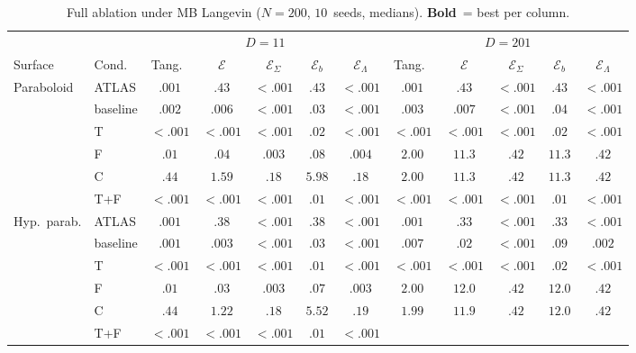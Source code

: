 \documentclass[11pt]{article}
\newcommand{\cE}{\mathcal{E}}
\begin{document}
\begin{table}[ht]
\centering
\caption{Full ablation under MB Langevin ($N{=}200$, $10$~seeds, medians).
\textbf{Bold}~= best per column.}
\label{tab:full-ablation-mb}
\footnotesize
\begin{tabular}{ll ccccc ccccc}
\toprule
 & & \multicolumn{5}{c}{$D{=}11$} & \multicolumn{5}{c}{$D{=}201$} \\
\cmidrule(lr){3-7} \cmidrule(lr){8-12}
Surface & Cond.\ & Tang.\ & $\cE$ & $\cE_\Sigma$
        & $\cE_b$ & $\cE_\Lambda$
        & Tang.\ & $\cE$ & $\cE_\Sigma$
        & $\cE_b$ & $\cE_\Lambda$ \\
\midrule
Paraboloid
 & ATLAS    & $.001$ & $.43$  & $<.001$ & $.43$  & $<.001$
            & $.001$ & $.43$  & $<.001$ & $.43$  & $<.001$ \\
 & baseline & $.002$ & $.006$ & $<.001$ & $.03$  & $<.001$
            & $.003$ & $.007$ & $<.001$ & $.04$  & $<.001$ \\
 & T        & $\mathbf{<.001}$ & $\mathbf{<.001}$ & $<.001$ & $.02$  & $<.001$
            & $\mathbf{<.001}$ & $\mathbf{<.001}$ & $<.001$ & $.02$  & $<.001$ \\
 & F        & $.01$  & $.04$  & $.003$ & $.08$  & $.004$
            & $2.00$ & $11.3$ & $.42$  & $11.3$ & $.42$ \\
 & C        & $.44$  & $1.59$ & $.18$  & $5.98$ & $.18$
            & $2.00$ & $11.3$ & $.42$  & $11.3$ & $.42$ \\
 & T+F      & $<.001$ & $<.001$ & $<.001$ & $\mathbf{.01}$  & $<.001$
            & $<.001$ & $<.001$ & $<.001$ & $\mathbf{.01}$  & $<.001$ \\
\midrule
Hyp.~parab.
 & ATLAS    & $.001$ & $.38$  & $<.001$ & $.38$  & $<.001$
            & $.001$ & $.33$  & $<.001$ & $.33$  & $<.001$ \\
 & baseline & $.001$ & $.003$ & $<.001$ & $.03$  & $<.001$
            & $.007$ & $.02$  & $<.001$ & $.09$  & $.002$ \\
 & T        & $\mathbf{<.001}$ & $\mathbf{<.001}$ & $<.001$ & $.01$  & $<.001$
            & $\mathbf{<.001}$ & $\mathbf{<.001}$ & $<.001$ & $.02$  & $<.001$ \\
 & F        & $.01$  & $.03$  & $.003$ & $.07$  & $.003$
            & $2.00$ & $12.0$ & $.42$  & $12.0$ & $.42$ \\
 & C        & $.44$  & $1.22$ & $.18$  & $5.52$ & $.19$
            & $1.99$ & $11.9$ & $.42$  & $12.0$ & $.42$ \\
 & T+F      & $<.001$ & $<.001$ & $<.001$ & $\mathbf{.01}$  & $<.001$

\end{tabular}
\end{table}
\end{document}
